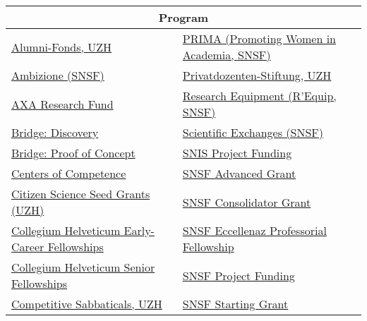 \begin{table}[ht] \hspace*{-5em} 
\centering
\begin{tabular}{ll}
\hline
\multicolumn{2}{c}{Program} \\
\hline
\href{https://uzhalumni.ch/page/alumnifonds?lang=en}{Alumni-Fonds, UZH} & \href{https://www.research.uzh.ch/en/funding/postdoc/prima.html}{PRIMA (Promoting Women in Academia, SNSF)} \\
\href{https://www.research.uzh.ch/en/funding/postdoc/ambizione.html}{Ambizione (SNSF)} & \href{https://www.research.uzh.ch/en/funding/researchers/pd-stiftung.html}{Privatdozenten-Stiftung, UZH} \\
\href{https://www.research.uzh.ch/en/funding/postdoc/axa.html}{AXA Research Fund} & \href{http://www.snf.ch/en/funding/infrastructures/requip/Pages/default.aspx}{Research Equipment (R’Equip, SNSF)} \\
\href{https://www.innovation.uzh.ch/en/entrepreneur-guide/funding/bridge-snf-innosuisse.html}{Bridge: Discovery} & \href{http://www.snf.ch/en/funding/science-communication/scientific-exchanges/Pages/default.aspx}{Scientific Exchanges (SNSF)} \\
\href{https://www.innovation.uzh.ch/en/entrepreneur-guide/funding/bridge-snf-innosuisse.html}{Bridge: Proof of Concept} & \href{https://snis.ch/funding/}{SNIS Project Funding} \\
\href{https://www.research.uzh.ch/en/funding/researchers/competence.html}{Centers of Competence} & \href{https://www.research.uzh.ch/en/funding/researchers/SNSF-Advanced-Grant.html}{SNSF Advanced Grant} \\
\href{https://www.citizenscience.uzh.ch/en/services/seedgrants.html}{Citizen Science Seed Grants (UZH)} & \href{https://www.research.uzh.ch/en/funding/postdoc/SNSF-Consolidator-Grant.html}{SNSF Consolidator Grant} \\
\href{https://collegium.ethz.ch/fellowships/early-career-fellowship}{Collegium Helveticum Early-Career Fellowships} & \href{https://www.research.uzh.ch/en/funding/postdoc/eccellenza-fellowships.html}{SNSF Eccellenaz Professorial Fellowship} \\
\href{https://collegium.ethz.ch/fellowships/senior-fellowship}{Collegium Helveticum Senior Fellowships} & \href{https://www.research.uzh.ch/en/funding/researchers/snf-projekte.html}{SNSF Project Funding} \\
\href{https://www.research.uzh.ch/en/funding/researchers/forschungssemester.html}{Competitive Sabbaticals, UZH} & \href{https://www.research.uzh.ch/en/funding/postdoc/SNSF-Starting-Grant.html}{SNSF Starting Grant} \\

\end{tabular}
\end{table}
